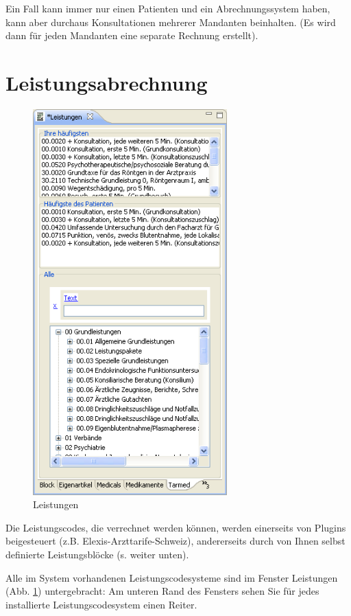 Ein Fall kann immer nur einen Patienten und ein Abrechnungssystem haben, kann aber durchaus  Konsultationen mehrerer Mandanten beinhalten. (Es wird dann für jeden Mandanten eine separate Rechnung erstellt).

\clearpage

\section{Leistungsabrechnung}
\label{concept:leistung}
\begin{figure}
    \includegraphics[width=7.5cm]{images/leistungen1}
    \caption{Leistungen}
    \label{fig:leistungen}
\end{figure}
Die Leistungscodes, die verrechnet werden können, werden einerseits von Plugins beigesteuert (z.B. Elexis-Arzttarife-Schweiz), andererseits durch von Ihnen selbst definierte Leistungsblöcke (s. weiter unten).

Alle im System vorhandenen Leistungscodesysteme sind im Fenster \glqq Leistungen\grqq{} (Abb. \ref{fig:leistungen}) untergebracht: Am unteren Rand des Fensters sehen Sie für jedes installierte Leistungscodesystem einen Reiter.

